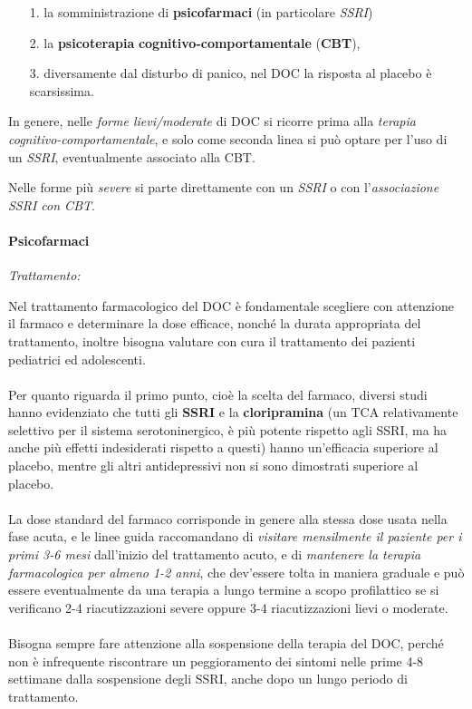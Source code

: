 \begin{itemize}
\item[1.]
  la somministrazione di \textbf{psicofarmaci} (in particolare
  \emph{SSRI})
\item[2.]
  la \textbf{psicoterapia} \textbf{cognitivo-comportamentale}
  (\textbf{CBT}),
\item[3.]
  diversamente dal disturbo di panico, nel DOC la risposta al placebo è
  scarsissima.
\end{itemize}

In genere, nelle \emph{forme lievi/moderate} di DOC si ricorre prima
alla \emph{terapia cognitivo-comportamentale}, e solo come seconda linea
si può optare per l'uso di un \emph{SSRI}, eventualmente associato alla
CBT.

Nelle forme più \emph{severe} si parte direttamente con un \emph{SSRI} o
con l'\emph{associazione SSRI con CBT}.

\paragraph{Psicofarmaci}

\emph{\emph{Trattamento:}}

Nel trattamento farmacologico del DOC è fondamentale scegliere con
attenzione il farmaco e determinare la dose efficace, nonché la durata
appropriata del trattamento, inoltre bisogna valutare con cura il
trattamento dei pazienti pediatrici ed adolescenti.
\\\\
Per quanto riguarda il primo punto, cioè la scelta del farmaco, diversi
studi hanno evidenziato che tutti gli \textbf{SSRI} e la
\textbf{cloripramina} (un TCA relativamente selettivo per il sistema
serotoninergico, è più potente rispetto agli SSRI, ma ha anche più
effetti indesiderati rispetto a questi) hanno un'efficacia superiore al
placebo, mentre gli altri antidepressivi non si sono dimostrati
superiore al placebo.
\\\\
La dose standard del farmaco corrisponde in genere alla stessa dose
usata nella fase acuta, e le linee guida raccomandano di \emph{visitare
mensilmente il paziente per i primi 3-6 mesi} dall'inizio del
trattamento acuto, e di \emph{mantenere la terapia farmacologica per
almeno 1-2 anni}, che dev'essere tolta in maniera graduale e può essere
eventualmente da una terapia a lungo termine a scopo profilattico se si
verificano 2-4 riacutizzazioni severe oppure 3-4 riacutizzazioni lievi o
moderate.
\\\\
Bisogna sempre fare attenzione alla sospensione della terapia del DOC,
perché non è infrequente riscontrare un peggioramento dei sintomi nelle
prime 4-8 settimane dalla sospensione degli SSRI, anche dopo un lungo
periodo di trattamento.

